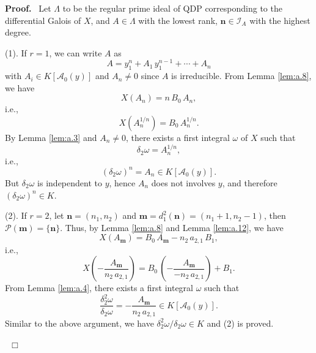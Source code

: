 \documentclass[preprint, 12pt]{elsarticle}
\numberwithin{equation}{section}
\newenvironment{proof}[1][Proof]{\textbf{#1.}\ }{\ $\Box$}
\newcommand{\A}{\mathcal{A}}
\begin{document}
\begin{proof}
Let $\Lambda$ to be the regular prime ideal of QDP 
corresponding to the differential Galois of $X$, and $A\in \Lambda$
with the lowest rank, $\mathbf{n}\in \mathcal{I}_A$ with the highest degree.

(1). If $r = 1$, we can write $A$ as
$$A = y_1^n + A_1\,y_1^{n-1} + \cdots + A_n$$
with $A_i \in K[\A_0(y)]$ and $A_n\not=0$ since $A$ is irreducible. From Lemma \ref{lem:a.8}, we have
$$X(A_n) = n\,B_0\,A_n,$$
i.e.,
$$X(A_n^{1/n}) = B_0\,A_n^{1/n}.$$
By Lemma \ref{lem:a.3} and $A_n\not=0$, there exists a first integral $\omega$ of $X$ such
that
$$\delta_2\omega = A_n^{1/n},$$
i.e.,
$$(\delta_2\omega)^n = A_n\in K[\A_0(y)].$$
But $\delta_2\omega$ is independent to $y$, hence $A_n$ does not involves $y$, and therefore $(\delta_2\omega)^n \in K$.

(2). If $r = 2$, let $\mathbf{n} = (n_1,n_2)$  and $\mathbf{m} =
d_1^2(\mathbf{n}) = (n_1+1,n_2-1)$, then $\mathcal{P}(\mathbf{m}) =
\{\mathbf{n}\}$. Thus, by Lemma \ref{lem:a.8} and Lemma
\ref{lem:a.12}, we have
$$X(A_{\mathbf{m}}) = B_0\,A_{\mathbf{m}} - n_2\,a_{2,1}\,B_1,$$
i.e.,
$$X(-\frac{A_{\mathbf{m}}}{n_2\,a_{2,1}}) = B_0\,(-\frac{A_{\mathbf{m}}}{-n_2\,a_{2,1}})+B_1.$$
From Lemma \ref{lem:a.4}, there exists a first integral $\omega$
such that
$$\frac{\delta_2^2\omega}{\delta_2\omega} = -\frac{A_{\mathbf{m}}}{n_2\,a_{2,1}}\in K[\A_0(y)].$$
Similar to the above argument, we have $\delta_2^2\omega/\delta_2\omega\in K$ and (2) is proved.


\end{proof}
\end{document}
